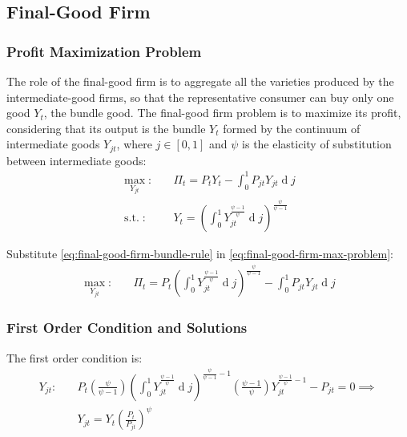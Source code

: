 \documentclass[
	12pt, 
	]{article}
\numberwithin{equation}{section}
\DeclareMathOperator{\dif}{d}
\DeclareMathOperator{\st}{s.t.}
\theoremstyle{definition}
\theoremstyle{plain}
\theoremstyle{plain}
\theoremstyle{plain}
\begin{document}

\subsection{Final-Good Firm}

\subsubsection*{Profit Maximization Problem}

The role of the final-good firm is to aggregate all the varieties produced by the intermediate-good firms, so that the representative consumer can buy only one good $Y_t$, the bundle good. The final-good firm problem is to maximize its profit, considering that its output is the bundle $Y_t$ formed by the continuum of intermediate goods $Y_{jt}$, where $j \in [0,1]$ and $\psi$ is the elasticity of substitution between intermediate goods:
\begin{align}
\label{eq:final-good-firm-max-problem}
	\max_{Y_{jt}}: &\quad \Pi_t = P_t Y_t - \int_{0}^{1} P_{jt} Y_{jt} \dif j\\
\label{eq:final-good-firm-bundle-rule}
	\st: & \quad Y_t = \left( \int_{0}^{1} Y_{jt}^{\frac{\psi-1}{\psi}} \dif j \right)^{\frac{\psi}{\psi-1}}
\end{align}

Substitute \ref{eq:final-good-firm-bundle-rule} in \ref{eq:final-good-firm-max-problem}:
\begin{align}
\label{eq:final-good-firm-max-problem-2}
	\max_{Y_{jt}}: & \quad \Pi_t = P_t \left( \int_{0}^{1} Y_{jt}^{\frac{\psi-1}{\psi}} \dif j \right)^{\frac{\psi}{\psi-1}} - \int_{0}^{1} P_{jt} Y_{jt} \dif j
\end{align}

\subsubsection*{First Order Condition and Solutions}

The first order condition is:
\begin{align}
	Y_{jt}:\quad & P_t \left( \frac{\psi}{\psi-1} \right) \left( \int_{0}^{1} Y_{jt}^{\frac{\psi-1}{\psi}} \dif j \right)^{\frac{\psi}{\psi-1}-1} \left( \frac{\psi-1}{\psi} \right) Y_{jt}^{\frac{\psi-1}{\psi}-1} - P_{jt} = 0 \implies \nonumber \\
\label{eq:final-good-firm-FOC}
	& Y_{jt} = Y_t \left( \frac{P_t}{P_{jt}} \right)^{\psi}
\end{align}
\end{document}
